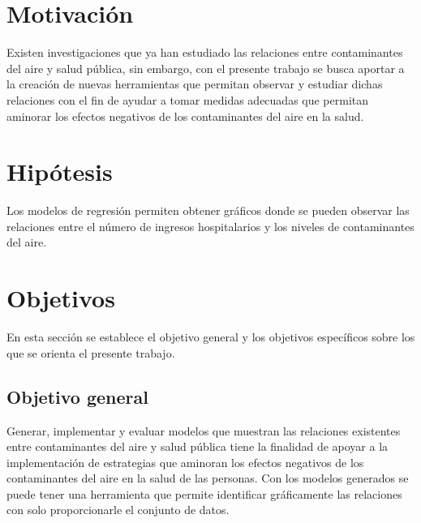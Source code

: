 \clearpage
\section{Motivación}
Existen investigaciones que ya han estudiado las relaciones entre contaminantes del aire y salud pública, sin embargo, con el presente trabajo se busca aportar a la creación de nuevas herramientas que permitan observar y estudiar dichas relaciones con el fin de ayudar a tomar medidas adecuadas que permitan aminorar los efectos negativos de los contaminantes del aire en la salud.

\section{Hipótesis}
Los modelos de regresión permiten obtener gráficos donde se pueden observar las relaciones entre el número de ingresos hospitalarios y los niveles de contaminantes del aire.

\section{Objetivos}
En esta sección se establece el objetivo general y los objetivos específicos sobre los que se orienta el presente trabajo.

\subsection{Objetivo general}
Generar, implementar y evaluar modelos que muestran las relaciones existentes entre contaminantes del aire y salud pública tiene la finalidad de apoyar a la implementación de estrategias que aminoran los efectos negativos de los contaminantes del aire en la salud de las personas. Con los modelos generados se puede tener una herramienta que permite identificar gráficamente las relaciones con solo proporcionarle el conjunto de datos.

